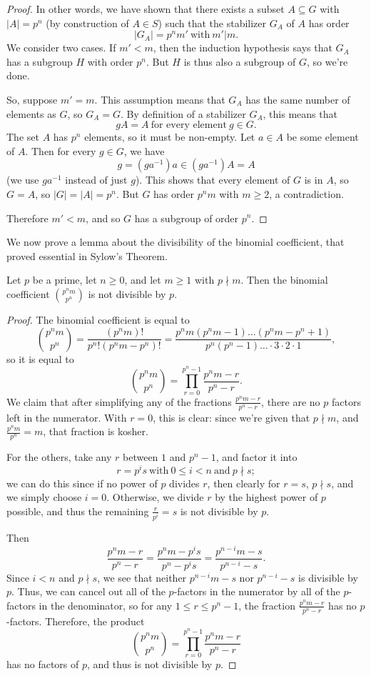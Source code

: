 \documentclass[math1530-lecture-notes]{subfiles}
\begin{document}
\begin{proof}[Proof]
  \-\hspace{2em} In other words, we have shown that there exists a subset $A\subseteq G$ with
  $\left| A \right| =p^n$ (by construction of $A\in S$) such that the stabilizer $G_{A}$ of $A$ has
  order \[
    \left| G_A \right| =p^nm' ~\text{with}~m'|m
  .\] We consider two cases. If $m'<m$, then the induction hypothesis says that $G_A$ has a subgroup
  $H$ with order $p^n$. But $H$ is thus also a subgroup of $G$, so we're done.

  So, suppose $m'=m$. This assumption means that $G_A$ has the same number of elements as $G$, so
  $G_A=G$. By definition of a stabilizer $G_A$, this means that \[
    gA=A~\text{for every element}~g\in G
  .\] The set $A$ has $p^n$ elements, so it must be non-empty. Let $a\in A$ be some element of $A$.
  Then for every $g\in G$, we have \[
    g=(ga^{-1})a\in (ga^{-1})A=A
  \] (we use $ga^{-1}$ instead of just $g$). This shows that every element of $G$ is in $A$, so
  $G=A$, so $\left| G \right| =\left| A \right| =p^n$. But $G$ has order $p^nm$ with $m\ge 2$, a
  contradiction. 

  Therefore $m'<m$, and so $G$ has a subgroup of order $p^n$.
\end{proof}

We now prove a lemma about the divisibility of the binomial coefficient, that proved essential in
Sylow's Theorem.
\begin{lemma}{}
  Let $p$ be a prime, let $n\ge 0$, and let $m\ge 1$ with $p\nmid m$. Then the binomial coefficient
  $\binom{p^nm}{p^n}$ is not divisible by $p$.
\end{lemma}
\begin{proof}[Proof]
  The binomial coefficient is equal to \[
    \binom{p^nm}{p^n}=\frac{(p^nm)!}{p^n!(p^nm-p^n)!}=\frac{p^nm(p^nm-1)\ldots(p^nm-p^n+1)}{p^n(p^n-1)\ldots\cdot
    3\cdot 2\cdot 1}
  ,\] so it is equal to \[
    \binom{p^nm}{p^n}=\prod_{r=0}^{p^n-1} \frac{p^nm-r}{p^n-r} 
  .\] We claim that after simplifying any of the fractions $\frac{p^nm-r}{p^n-r}$, there are no $p$
  factors left in the numerator. With $r=0$, this is clear: since we're given that $p\nmid m$, and
  $\frac{p^nm}{p^n}=m$, that fraction is kosher.

  For the others, take any $r$ between $1$ and $p^n-1$, and factor it into \[
    r=p^is~\text{with}~0\le i<n~\text{and}~p\nmid s
  ;\] we can do this since if no power of $p$ divides $r$, then clearly for $r=s$, $p\nmid s$, and we
  simply choose $i=0$. Otherwise, we divide $r$ by the highest power of $p$ possible, and thus the
  remaining $\frac{r}{p^i}=s$ is not divisible by $p$.

  Then \[
    \frac{p^nm-r}{p^n-r}=\frac{p^nm-p^is}{p^n-p^is}=\frac{p^{n-i}m-s}{p^{n-i}-s}
  .\] Since $i<n$ and $p\nmid s$, we see that neither $p^{n-i}m-s$ nor $p^{n-i}-s$ is divisible by
  $p$. Thus, we can cancel out all of the $p$-factors in the numerator by all of the $p$-factors in
  the denominator, so for any $1\le r\le p^n-1$, the fraction $\frac{p^nm-r}{p^n-r}$ has no
  $p$-factors. Therefore, the product \[
    \binom{p^nm}{p^n}=\prod_{r=0}^{p^n-1} \frac{p^nm-r}{p^n-r} 
  \] has no factors of $p$, and thus is not divisible by $p$.
\end{proof}
\end{document}
